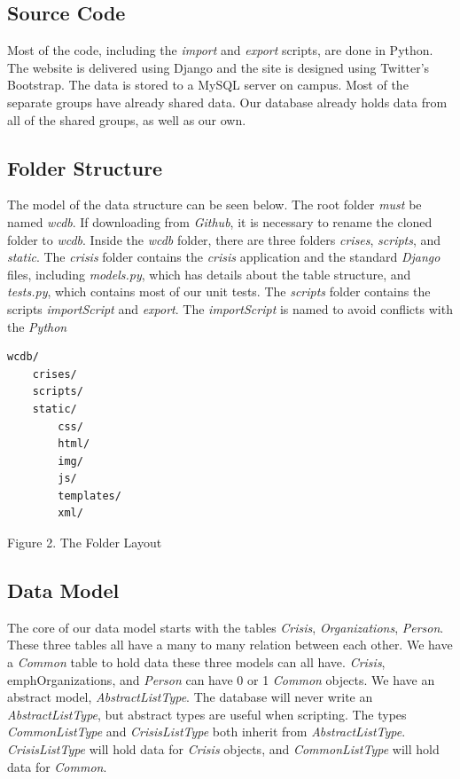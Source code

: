 \documentclass[12pt]{report}
\begin{document}
\subsection*{Source Code}
Most of the code, including the \emph{import} and \emph{export} scripts, are done in Python.
The website is delivered using Django and the site is designed using Twitter's Bootstrap.
The data is stored to a MySQL server on campus.
Most of the separate groups have already shared data.
Our database already holds data from all of the shared groups, as well as our own.

\subsection*{Folder Structure}
The model of the data structure can be seen below.
The root folder \emph{must} be named \emph{wcdb}.
If downloading from \emph{Github}, it is necessary to rename the cloned folder to \emph{wcdb}.
Inside the \emph{wcdb} folder, there are three folders \emph{crises}, \emph{scripts}, and \emph{static}.
The \emph{crisis} folder contains the \emph{crisis} application and the standard \emph{Django} files,
including \emph{models.py}, which has details about the table structure, and \emph{tests.py}, which contains
most of our unit tests.
The \emph{scripts} folder contains the scripts \emph{importScript} and \emph{export}.
The \emph{importScript} is named to avoid conflicts with the \emph{Python}

\hfill \newline
{}
\begin{lstlisting}
wcdb/
    crises/
    scripts/
    static/
        css/
        html/
        img/
        js/
        templates/
        xml/
\end{lstlisting}

\footnotesize Figure 2. The Folder Layout \normalsize

\subsection*{Data Model}
The core of our data model starts with the tables \emph{Crisis}, \emph{Organizations}, \emph{Person}.
These three tables all have a many to many relation between each other.
We have a \emph{Common} table to hold data these three models can all have.
\emph{Crisis}, emph{Organizations}, and \emph{Person} can have 0 or 1 \emph{Common} objects.
We have an abstract model, \emph{AbstractListType}.
The database will never write an \emph{AbstractListType}, but abstract types are useful when scripting.
The types \emph{CommonListType} and \emph{CrisisListType} both inherit from \emph{AbstractListType}.
\emph{CrisisListType} will hold data for \emph{Crisis} objects, and \emph{CommonListType} will hold data for \emph{Common}.
\end{document}
